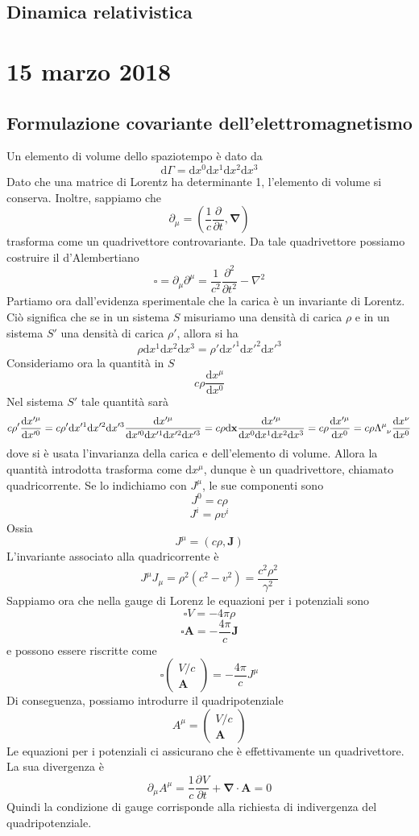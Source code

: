 \documentclass[a4paper,11pt]{book}
\newcommand{\dif}{\mathrm{d}}
\renewcommand{\d}{\mathrm{d}}
\newcommand{\der}[3][]{\frac{\partial ^{#1}#2}{\partial {#3}^{#1}}}
\let\oldnabla\nabla
\renewcommand{\nabla}{\vec{\oldnabla}}
\newcommand{\lap}{\oldnabla^2}
\renewcommand{\vec}[1]{\mathbf{#1}}
\theoremstyle{theorem}
\theoremstyle{definition}
\begin{document}
\subsection{Dinamica relativistica}
\newpage
\section{15 marzo 2018}
\subsection{Formulazione covariante dell'elettromagnetismo}
Un elemento di volume dello spaziotempo è dato da
\[\dif\Gamma=\dif x^0\dif x^1\dif x^2\dif x^3\]
Dato che una matrice di Lorentz ha determinante 1, l'elemento di volume si conserva. Inoltre, sappiamo che 
\[\partial_\mu=\left(\frac{1}{c}\der{}{t},\nabla\right)\]
trasforma come un quadrivettore controvariante. Da tale quadrivettore possiamo costruire il d'Alembertiano
\[\square=\partial_\mu\partial^\mu=\frac{1}{c^2}\der[2]{}{t}-\lap\]
Partiamo ora dall'evidenza sperimentale che la carica è un invariante di Lorentz. Ciò significa che se in un sistema $S$ misuriamo una densità di carica $\rho$ e in un sistema $S'$ una densità di carica $\rho'$, allora si ha
\[\rho\d x^1\d x^2\d x^3=\rho'\d x'^1\d x'^2\d x'^3\]
Consideriamo ora la quantità in $S$
\[c\rho\frac{\d x^\mu}{\d x^0}\]
Nel sistema $S'$ tale quantità sarà
\[c\rho'\frac{\d x'^\mu}{\d x'^0}=c\rho'\d x'^1\d x'^2\d x'^3\frac{\d x'^\mu}{\d x'^0\d x'^1\d x'^2\d x'^3}=c\rho\d\vec{x}\frac{\d x'^\mu}{\d x^0\d x^1\d x^2\d x^3}=c\rho\frac{\d x'^\mu}{\d x^0}=c\rho\Lambda\indices{^\mu_\nu}\frac{\d x^\nu}{\d x^0}\]
dove si è usata l'invarianza della carica e dell'elemento di volume. Allora la quantità introdotta trasforma come $\d x^\mu$, dunque è un quadrivettore, chiamato quadricorrente. Se lo indichiamo con $J^\mu$, le sue componenti sono
\[J^0=c\rho\]
\[J^i=\rho v^i\]
Ossia
\[J^\mu=(c\rho,\vec{J})\]
L'invariante associato alla quadricorrente è
\[J^\mu J_\mu=\rho^2(c^2-v^2)=\frac{c^2\rho^2}{\gamma^2}\]
Sappiamo ora che nella gauge di Lorenz le equazioni per i potenziali sono
\[\square V=-4\pi\rho\]
\[\square\vec{A}=-\frac{4\pi}{c}\vec{J}\]
e possono essere riscritte come
\[\square\left(\begin{array}{c}
V/c\\\vec{A}
\end{array}\right)=-\frac{4\pi}{c}J^\mu\]
Di conseguenza, possiamo introdurre il quadripotenziale
\[A^\mu=\left(\begin{array}{c}
V/c\\\vec{A}
\end{array}\right)\]
Le equazioni per i potenziali ci assicurano che è effettivamente un quadrivettore. La sua divergenza è
\[\partial_\mu A^\mu=\frac{1}{c}\der{V}{t}+\nabla\cdot\vec{A}=0\]
Quindi la condizione di gauge corrisponde alla richiesta di indivergenza del quadripotenziale.
\end{document}
